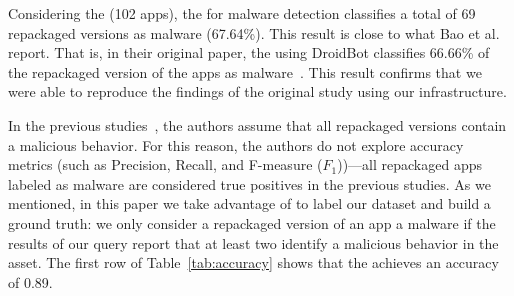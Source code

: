 
Considering the \sds (102 apps), the \mas for malware detection 
classifies a total of 69 repackaged versions as malware (67.64\%).
This result is close to what Bao et al. report. That is, in their
original paper,  the \mas using DroidBot classifies 66.66\% of the
repackaged version of the apps as malware~\cite{DBLP:conf/wcre/BaoLL18}.
This result confirms that we were able to reproduce
the findings of the original study using our
infrastructure. 


In the previous studies~\cite{DBLP:conf/wcre/BaoLL18,DBLP:journals/jss/CostaMMSSBNR22},
the authors assume that all repackaged versions contain a
malicious behavior. For this reason, the authors do not
explore accuracy metrics (such as Precision, Recall, and
F-measure ($F_1$))---all repackaged apps labeled as
malware are considered true positives in the previous studies.
As we mentioned, in this paper we take advantage
of \vt to label our dataset and build a ground truth: we only
consider a repackaged version of an app a malware if the results
of our \vt query report that at least two
\ses identify a malicious behavior in the asset. %
The first row of Table~\ref{tab:accuracy} shows that the \mas achieves an accuracy of 0.89. 

\begin{table}[htb]
  \caption{Accuracy of the \mas in both datasets.}
  \label{tab:accuracy}
\end{table}

